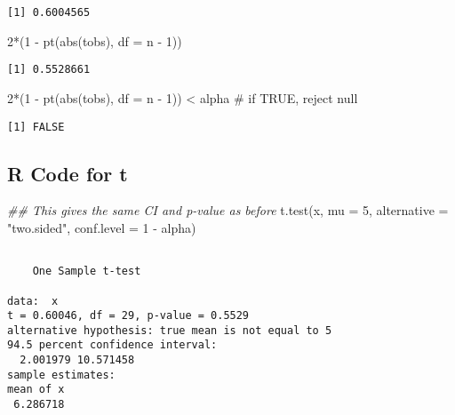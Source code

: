 \documentclass[
  letterpaper,
  DIV=11,
  numbers=noendperiod]{scrreprt}
\newenvironment{Shaded}{\begin{snugshade}}{\end{snugshade}}
\newcommand{\AttributeTok}[1]{\textcolor[rgb]{0.40,0.45,0.13}{#1}}
\newcommand{\CommentTok}[1]{\textcolor[rgb]{0.37,0.37,0.37}{#1}}
\newcommand{\DecValTok}[1]{\textcolor[rgb]{0.68,0.00,0.00}{#1}}
\newcommand{\DocumentationTok}[1]{\textcolor[rgb]{0.37,0.37,0.37}{\textit{#1}}}
\newcommand{\FunctionTok}[1]{\textcolor[rgb]{0.28,0.35,0.67}{#1}}
\newcommand{\NormalTok}[1]{\textcolor[rgb]{0.00,0.23,0.31}{#1}}
\newcommand{\SpecialCharTok}[1]{\textcolor[rgb]{0.37,0.37,0.37}{#1}}
\newcommand{\StringTok}[1]{\textcolor[rgb]{0.13,0.47,0.30}{#1}}
\begin{document}
\begin{verbatim}
[1] 0.6004565
\end{verbatim}

\begin{Shaded}
\begin{Highlighting}[]
\DecValTok{2}\SpecialCharTok{*}\NormalTok{(}\DecValTok{1} \SpecialCharTok{{-}} \FunctionTok{pt}\NormalTok{(}\FunctionTok{abs}\NormalTok{(tobs), }\AttributeTok{df =}\NormalTok{ n }\SpecialCharTok{{-}} \DecValTok{1}\NormalTok{))}
\end{Highlighting}
\end{Shaded}

\begin{verbatim}
[1] 0.5528661
\end{verbatim}

\begin{Shaded}
\begin{Highlighting}[]
\DecValTok{2}\SpecialCharTok{*}\NormalTok{(}\DecValTok{1} \SpecialCharTok{{-}} \FunctionTok{pt}\NormalTok{(}\FunctionTok{abs}\NormalTok{(tobs), }\AttributeTok{df =}\NormalTok{ n }\SpecialCharTok{{-}} \DecValTok{1}\NormalTok{)) }\SpecialCharTok{\textless{}}\NormalTok{ alpha }\CommentTok{\# if TRUE, reject null}
\end{Highlighting}
\end{Shaded}

\begin{verbatim}
[1] FALSE
\end{verbatim}

\hypertarget{r-code-for-t}{%
\subsection{R Code for t}\label{r-code-for-t}}

\begin{Shaded}
\begin{Highlighting}[]
\DocumentationTok{\#\# This gives the same CI and p{-}value as before}
\FunctionTok{t.test}\NormalTok{(x, }\AttributeTok{mu =} \DecValTok{5}\NormalTok{, }\AttributeTok{alternative =} \StringTok{"two.sided"}\NormalTok{, }\AttributeTok{conf.level =} \DecValTok{1} \SpecialCharTok{{-}}\NormalTok{ alpha)}
\end{Highlighting}
\end{Shaded}

\begin{verbatim}

    One Sample t-test

data:  x
t = 0.60046, df = 29, p-value = 0.5529
alternative hypothesis: true mean is not equal to 5
94.5 percent confidence interval:
  2.001979 10.571458
sample estimates:
mean of x 
 6.286718 
\end{verbatim}
\end{document}
